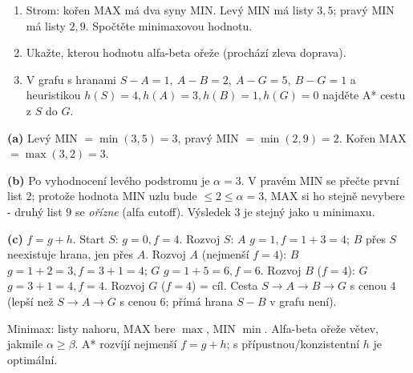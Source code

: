 \begin{zadani}
\begin{enumerate}[label=(\alph*)]
  \item {} Strom: kořen MAX má dva syny MIN. Levý MIN má listy $3,5$; pravý MIN má listy $2,9$. Spočtěte minimaxovou hodnotu.
  \item {} Ukažte, kterou hodnotu alfa-beta ořeže (prochází zleva doprava).
  \item {} V grafu s hranami $S{-}A{=}1,\ A{-}B{=}2,\ A{-}G{=}5,\ B{-}G{=}1$ a heuristikou $h(S){=}4,h(A){=}3,h(B){=}1,h(G){=}0$ najděte A* cestu z $S$ do $G$.
\end{enumerate}
\end{zadani}

\begin{reseni}
\textbf{(a)} Levý MIN $=\min(3,5)=3$, pravý MIN $=\min(2,9)=2$. Kořen MAX $=\max(3,2)=3$.

\textbf{(b)} Po vyhodnocení levého podstromu je $\alpha=3$. V pravém MIN se přečte první list $2$; protože hodnota MIN uzlu bude $\le2\le\alpha=3$, MAX si ho stejně nevybere - druhý list $9$ se \emph{ořízne} (alfa cutoff). Výsledek $3$ je stejný jako u minimaxu.

\textbf{(c)} $f=g+h$. Start $S$: $g{=}0,f{=}4$. Rozvoj $S$: $A$ $g{=}1,f{=}1{+}3{=}4$; $B$ přes $S$ neexistuje hrana, jen přes $A$. Rozvoj $A$ (nejmenší $f{=}4$): $B$ $g{=}1{+}2{=}3,f{=}3{+}1{=}4$; $G$ $g{=}1{+}5{=}6,f{=}6$. Rozvoj $B$ ($f{=}4$): $G$ $g{=}3{+}1{=}4,f{=}4$. Rozvoj $G$ ($f{=}4$) = cíl. Cesta $S\to A\to B\to G$ s cenou $4$ (lepší než $S\to A\to G$ s cenou $6$; přímá hrana $S{-}B$ v grafu není).
\end{reseni}

\begin{jadro}
Minimax: listy nahoru, MAX bere $\max$, MIN $\min$. Alfa-beta ořeže větev, jakmile $\alpha\ge\beta$. A* rozvíjí nejmenší $f{=}g{+}h$; s přípustnou/konzistentní $h$ je optimální.
\end{jadro}

